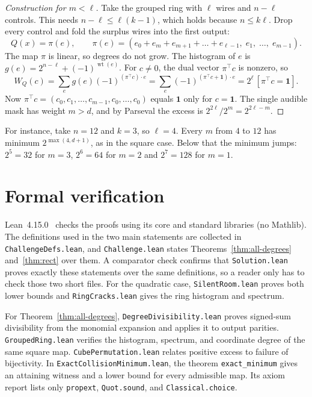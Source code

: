 \documentclass[11pt]{article}
\theoremstyle{definition}
\theoremstyle{remark}
\newcommand{\wt}{\operatorname{wt}}
\newcommand{\W}{W}
\newcommand{\one}{\mathbf{1}}
\begin{document}
\begin{proof}[Construction for $m<\ell$]
Take the grouped ring with $\ell$ wires and $n-\ell$ controls. This needs
$n-\ell\le\ell(k-1)$, which holds because $n\le k\ell$. Drop every control
and fold the surplus wires into the first output:
\[
  Q(x)=\pi(e),\qquad
  \pi(e)=(e_0+e_m+e_{m+1}+\dots+e_{\ell-1},\;e_1,\;\dots,\;e_{m-1}).
\]
The map $\pi$ is linear, so degrees do not grow. The histogram of $e$ is
$g(e)=2^{n-\ell}+(-1)^{\wt(e)}$. For $c\ne0$, the dual vector $\pi^{\top}c$
is nonzero, so
\[
  \W_Q(c)=\sum_e g(e)(-1)^{(\pi^{\top}c)\cdot e}
         =\sum_e(-1)^{(\pi^{\top}c+\one)\cdot e}
         =2^\ell\,[\pi^{\top}c=\one].
\]
Now $\pi^{\top}c=(c_0,c_1,\dots,c_{m-1},c_0,\dots,c_0)$ equals $\one$ only for
$c=\one$. The single audible mask has weight $m>d$, and by Parseval the excess
is $2^{2\ell}/2^m=2^{2\ell-m}$.
\end{proof}

For instance, take $n=12$ and $k=3$, so $\ell=4$. Every $m$ from $4$ to $12$
has minimum $2^{\max(4,d+1)}$, as in the square case. Below that the
minimum jumps: $2^5=32$ for $m=3$, $2^6=64$ for $m=2$ and $2^7=128$ for $m=1$.

\section{Formal verification}

Lean~4.15.0~\cite{Lean4} checks the proofs using its core and standard libraries
(no Mathlib). The definitions used in the two main statements are collected in
\texttt{ChallengeDefs.lean}, and \texttt{Challenge.lean} states
Theorems~\ref{thm:all-degrees} and~\ref{thm:rect} over them. A comparator check
confirms that \texttt{Solution.lean} proves exactly these statements over the
same definitions, so a reader only has to check those two short files.
For the quadratic case, \texttt{SilentRoom.lean} proves both lower bounds and
\texttt{RingCracks.lean} gives the ring histogram and spectrum.

For Theorem~\ref{thm:all-degrees}, \texttt{DegreeDivisibility.lean} proves
signed-sum divisibility from the monomial expansion and applies it to output
parities. \texttt{GroupedRing.lean} verifies the histogram, spectrum, and
coordinate degree of the same square map. \texttt{CubePermutation.lean}
relates positive excess to failure of bijectivity. In
\texttt{ExactCollisionMinimum.lean}, the theorem \texttt{exact\_minimum} gives
an attaining witness and a lower bound for every admissible map. Its axiom
report lists only \texttt{propext}, \texttt{Quot.sound}, and
\texttt{Classical.choice}.
\end{document}
